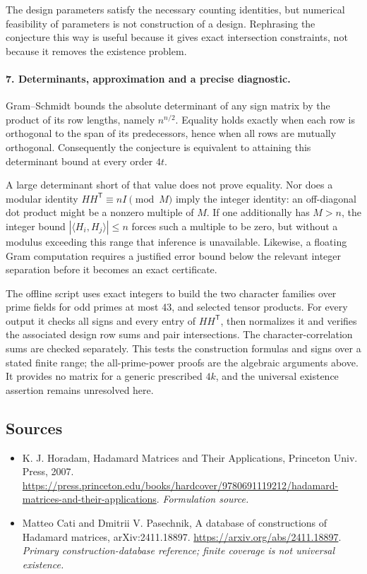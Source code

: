 \documentclass[11pt]{article}
\begin{document}
The design parameters satisfy the necessary counting identities, but numerical feasibility of parameters is not construction of a design. Rephrasing the conjecture this way is useful because it gives exact intersection constraints, not because it removes the existence problem.

\paragraph{7. Determinants, approximation and a precise diagnostic.}
Gram--Schmidt bounds the absolute determinant of any sign matrix by the product of its row lengths, namely $n^{n/2}$. Equality holds exactly when each row is orthogonal to the span of its predecessors, hence when all rows are mutually orthogonal. Consequently the conjecture is equivalent to attaining this determinant bound at every order $4t$.

A large determinant short of that value does not prove equality. Nor does a modular identity $HH^{\mathsf T}\equiv nI\pmod M$ imply the integer identity: an off-diagonal dot product might be a nonzero multiple of $M$. If one additionally has $M>n$, the integer bound $|\langle H_i,H_j\rangle|\le n$ forces such a multiple to be zero, but without a modulus exceeding this range that inference is unavailable. Likewise, a floating Gram computation requires a justified error bound below the relevant integer separation before it becomes an exact certificate.

The offline script uses exact integers to build the two character families over prime fields for odd primes at most 43, and selected tensor products. For every output it checks all signs and every entry of $HH^{\mathsf T}$, then normalizes it and verifies the associated design row sums and pair intersections. The character-correlation sums are checked separately. This tests the construction formulas and signs over a stated finite range; the all-prime-power proofs are the algebraic arguments above. It provides no matrix for a generic prescribed $4k$, and the universal existence assertion remains unresolved here.

\subsection{Sources}
\begin{itemize}
\item[S1]K. J. Horadam, Hadamard Matrices and Their Applications, Princeton Univ. Press, 2007.
\url{https://press.princeton.edu/books/hardcover/9780691119212/hadamard-matrices-and-their-applications}.
\textit{Formulation source.}
\item[E1]Matteo Cati and Dmitrii V. Pasechnik, A database of constructions of Hadamard matrices, arXiv:2411.18897.
\url{https://arxiv.org/abs/2411.18897}.
\textit{Primary construction-database reference; finite coverage is not universal existence.}
\end{itemize}
\end{document}
